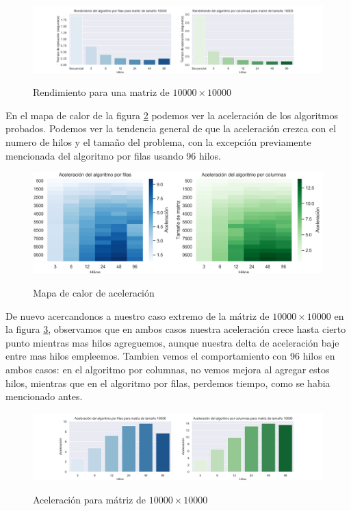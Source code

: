\documentclass{report}
\begin{document}
\begin{figure}[H]
    \centering
  \caption{Rendimiento para una matriz de $10000 \times 10000$}
  \includegraphics[width=\textwidth]{stars_perf_bar}
\label{fig:starperfbar}
\end{figure}

En el mapa de calor de la figura \ref{fig:staraccel} podemos ver la aceleración de
los algoritmos probados. Podemos ver la tendencia general de que la aceleración
crezca con el numero de hilos y el tamaño del problema, con la excepción previamente
mencionada del algoritmo por filas usando 96 hilos.

\begin{figure}[H]
    \centering
  \caption{Mapa de calor de aceleración}
\includegraphics[width=\textwidth]{stars_accel}
\label{fig:staraccel}
\end{figure}

De nuevo acercandonos a nuestro caso extremo de la mátriz de $10000 \times 10000$ en
la figura \ref{fig:staraccelbar}, observamos que en ambos casos nuestra aceleración
crece hasta cierto punto mientras mas hilos agreguemos, aunque nuestra delta de
aceleración baje entre mas hilos empleemos. Tambien vemos el comportamiento con 96
hilos en ambos casos: en el algoritmo por columnas, no vemos mejora al agregar estos
hilos, mientras que en el algoritmo por filas, perdemos tiempo, como se habia
mencionado antes.

\begin{figure}[H]
    \centering
  \caption{Aceleración para mátriz de $10000 \times 10000$}
\includegraphics[width=\textwidth]{stars_accel_bar}
\label{fig:staraccelbar}
\end{figure}
\end{document}
